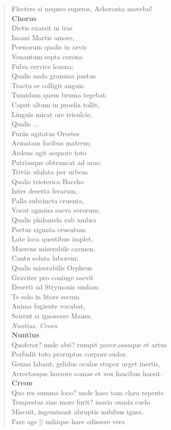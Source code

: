 \documentclass[11pt, a4paper]{report}
\begin{document}
\begin{verse}
{Flectere si nequeo superos, Acheronta movebo! \\ \textbf{Chorus} \\Dictis exarsit in iras \\ Insani Martis amore, \\ Poenorum qualis in arvis \\ Venantum septa corona \\ Fulva cervice leaena; \\ Qualis mala gramina pastus \\ Tractu se colligit anguis. \\ Tumidum quem bruma tegebat: \\ Caput altum in proelia tollit, \\ Linguis micat ore trisulcis; \\  \lbrack Qualis  \lbrack ... \rbrack  \\ Furiis agitatus Orestes \\ Armatam facibus matrem; \\ Ardens agit aequore toto \\ Patriasque obtruncat ad aras; \\ Triviis ululata per urbem \\ Qualis trieterica Baccho \\ Inter deserta ferarum, \\ Palla subcincta cruenta, \\ Vocat agmina saeva sororum; \\ Qualis philomela sub umbra \\ Pectus signata cruentum \\ Late loca questibus implet, \\ Maerens miserabile carmen, \\ Cantu solata laborem; \\  \lbrack Qualis miserabilis Orpheus \rbrack  \\ Graviter pro coniuge saevit \\ Deserti ad Strymonis undam: \\ Te solo in litore secum \\ Anima fugiente vocabat, \\ Scirent si ignoscere Manes. \\ \textit{Nuntius. Creon} \\ \textbf{Nuntius} \\Quoferor? unde abii?  \lbrack rumpit \rbrack  pavor,ossaque et artus \\ Perfudit toto proruptus corpore sudor. \\ Genua labant,  \lbrack gelidus \rbrack  oculos stupor urget inertis, \\ Arrectaeque horrore comae et vox faucibus haesit. \\ \textbf{Creon} \\Quo res summa loco? unde haec tam clara repente \\ Tempestas sine more furit? maria omnia caelo \\ Miscuit, ingeminant abruptis nubibus ignes. \\ Fare age || mihique haec edissere vera }
\end{verse}
\end{document}
